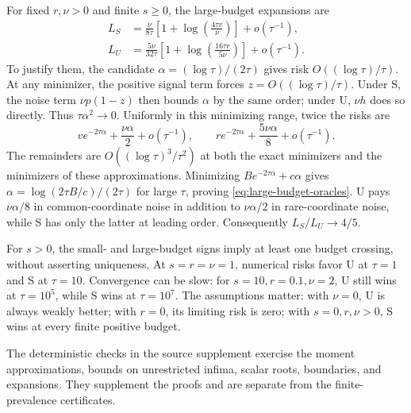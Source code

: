 For fixed $r,\nu>0$ and finite $s\geq0$, the large-budget expansions are
\begin{equation}
  \begin{aligned}
    L_S&=\frac{\nu}{8\tau}
      \left[1+\log\!\left(\frac{4\tau v}{\nu}\right)\right]
      +o(\tau^{-1}),\\
    L_U&=\frac{5\nu}{32\tau}
      \left[1+\log\!\left(\frac{16\tau r}{5\nu}\right)\right]
      +o(\tau^{-1}).
  \end{aligned}
  \label{eq:large-budget-oracles}
\end{equation}
To justify them, the candidate $\alpha=(\log\tau)/(2\tau)$ gives risk
$O((\log\tau)/\tau)$. At any minimizer, the positive signal term forces
$z=O((\log\tau)/\tau)$. Under S, the noise term $\nu p(1-z)$ then bounds
$\alpha$ by the same order; under U, $\nu h$ does so directly. Thus
$\tau\alpha^2\to0$. Uniformly in this minimizing range, twice the risks are
\[
  ve^{-2\tau\alpha}+\frac{\nu\alpha}{2}+o(\tau^{-1}),\qquad
  re^{-2\tau\alpha}+\frac{5\nu\alpha}{8}+o(\tau^{-1}).
\]
The remainders are $O((\log\tau)^3/\tau^2)$ at both the exact minimizers and
the minimizers of these approximations. Minimizing
$Be^{-2\tau\alpha}+c\alpha$ gives
$\alpha=\log(2\tau B/c)/(2\tau)$ for large $\tau$, proving
\cref{eq:large-budget-oracles}. U pays $\nu\alpha/8$ in common-coordinate
noise in addition to $\nu\alpha/2$ in rare-coordinate noise, while S has only
the latter at leading order. Consequently $L_S/L_U\to4/5$.

For $s>0$, the small- and large-budget signs imply at least one budget crossing,
without asserting uniqueness. At $s=r=\nu=1$, numerical risks favor U at
$\tau=1$ and S at $\tau=10$. Convergence can be slow: for $s=10,r=0.1,\nu=2$,
U still wins at $\tau=10^5$, while S wins at $\tau=10^7$. The assumptions
matter: with $\nu=0$, U is always weakly better; with $r=0$, its limiting risk
is zero; with $s=0,r,\nu>0$, S wins at every finite positive budget.

The deterministic checks in the source supplement exercise the moment
approximations, bounds on unrestricted infima, scalar roots, boundaries, and
expansions. They supplement the proofs and are separate from
the finite-prevalence certificates.
